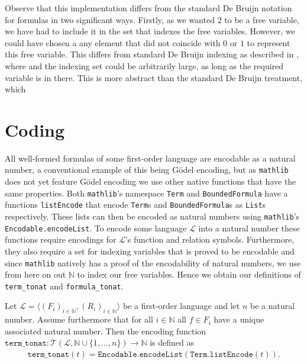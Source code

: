 Observe that this implementation differs from the standard De Bruijn notation for formulas in two significant ways. Firstly, as we wanted $2$ to be a free variable, we have had to include it in the set that indexes the free variables. However, we could have chosen a any element that did not coincide with $0$ or $1$ to represent this free variable. This differs from standard De Bruijn indexing as described in \cite{bruijn:1972}, where  and the indexing set could be arbitrarily large, as long as the required variable is in there. This is more abstract than the standard De Bruijn treatment, which

\section{Coding}\label{subsec:coding}
All well-formed formulas of some first-order language are encodable as a natural number, a conventional example of this being Gödel encoding, but as \texttt{mathlib} does not yet feature Gödel encoding we use other native functions that have the same properties. Both \texttt{mathlib}'s namespace \texttt{Term} and \texttt{BoundedFormula} have a functions \texttt{listEncode} that encode \texttt{Term}s and \texttt{BoundedFormula}s as \texttt{List}s respectively. These lists can then be encoded as natural numbers using \texttt{mathlib}'s \texttt{Encodable.encodeList}. To encode some language $\mathcal{L}$ into a natural number these functions require encodings for $\mathcal{L}$'s function and relation symbols. Furthermore, they also require a set for indexing variables that is proved to be encodable and since \texttt{mathlib} natively has a proof of the encodability of natural numbers, we use from here on out $\mathbb{N}$ to index our free variables. Hence we obtain our definitions of \texttt{term\_tonat} and \texttt{formula\_tonat}.

\begin{definition}\label{def:coding-ttn}
    Let $\mathcal{L} = \langle (F_i)_{i \in \mathbb{N}}, (R_i)_{i \in \mathbb{N}} \rangle$ be a first-order language and let $n$ be a natural number. Assume furthermore that for all $i \in \mathbb{N}$ all $f \in F_i$ have a unique associated natural number. Then the encoding function $\texttt{term\_tonat} : \mathcal{T}(\mathcal{L},\mathbb{N} \cup \{1,...,n\}) \to \mathbb{N}$ is defined as 
    \begin{align*}  
        \texttt{term\_tonat}(t) = \texttt{Encodable.encodeList}(\texttt{Term.listEncode}(t)).
    \end{align*}
\end{definition}

